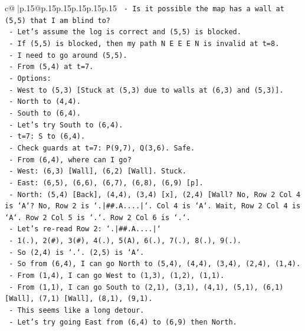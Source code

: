 \documentclass{article}
\begin{document}
{\begin{supertabular}{c@{$\;$}|p{.15\linewidth}@{}p{.15\linewidth}p{.15\linewidth}p{.15\linewidth}p{.15\linewidth}p{.15\linewidth}}
{{{\texttt{      {-} Is it possible the map has a wall at (5,5) that I am blind to?} \\
\texttt{      {-} Let's assume the log is correct and (5,5) is blocked.} \\
\texttt{      {-} If (5,5) is blocked, then my path N E E E N is invalid at t=8.} \\
\texttt{      {-} I need to go around (5,5).} \\
\texttt{      {-} From (5,4) at t=7.} \\
\texttt{      {-} Options:} \\
\texttt{        {-} West to (5,3) {[}Stuck at (5,3) due to walls at (6,3) and (5,3){]}.} \\
\texttt{        {-} North to (4,4).} \\
\texttt{        {-} South to (6,4).} \\
\texttt{      {-} Let's try South to (6,4).} \\
\texttt{      {-} t=7: S to (6,4).} \\
\texttt{      {-} Check guards at t=7: P(9,7), Q(3,6). Safe.} \\
\texttt{      {-} From (6,4), where can I go?} \\
\texttt{        {-} West: (6,3) {[}Wall{]}, (6,2) {[}Wall{]}. Stuck.} \\
\texttt{        {-} East: (6,5), (6,6), (6,7), (6,8), (6,9) {[}p{]}.} \\
\texttt{        {-} North: (5,4) {[}Back{]}, (4,4), (3,4) {[}x{]}, (2,4) {[}Wall? No, Row 2 Col 4 is `A`? No, Row 2 is `.|\#\#.A....|`. Col 4 is `A`. Wait, Row 2 Col 4 is `A`. Row 2 Col 5 is `.`. Row 2 Col 6 is `.`.} \\
\texttt{        {-} Let's re{-}read Row 2: `.|\#\#.A....|`} \\
\texttt{          {-} 1(.), 2(\#), 3(\#), 4(.), 5(A), 6(.), 7(.), 8(.), 9(.).} \\
\texttt{          {-} So (2,4) is `.`. (2,5) is `A`.} \\
\texttt{        {-} So from (6,4), I can go North to (5,4), (4,4), (3,4), (2,4), (1,4).} \\
\texttt{        {-} From (1,4), I can go West to (1,3), (1,2), (1,1).} \\
\texttt{        {-} From (1,1), I can go South to (2,1), (3,1), (4,1), (5,1), (6,1) {[}Wall{]}, (7,1) {[}Wall{]}, (8,1), (9,1).} \\
\texttt{        {-} This seems like a long detour.} \\
\texttt{      {-} Let's try going East from (6,4) to (6,9) then North.} \\
}}}
\end{supertabular}}
\end{document}
